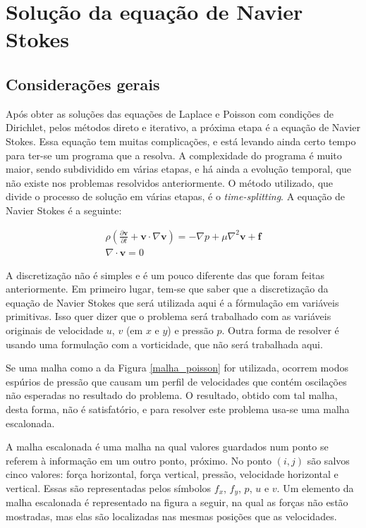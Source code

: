 \documentclass[journal]{IEEEtran}
\begin{document}
\section{Solução da equação de Navier Stokes}
\subsection*{Considerações gerais}
Após obter as soluções das equações de Laplace e Poisson com condições de Dirichlet, pelos métodos direto e iterativo, a próxima etapa é a equação de Navier Stokes. Essa equação tem muitas complicações, e está levando ainda certo tempo para ter-se um programa que a resolva. A complexidade do programa é muito maior, sendo subdividido em várias etapas, e há ainda a evolução temporal, que não existe nos problemas resolvidos anteriormente. O método utilizado, que divide o processo de solução em várias etapas, é o \textit{time-splitting}\cite{notas_de_aula_john}\cite{time_splitting}. A equação de Navier Stokes é a seguinte:

\begin{eqnarray}
\rho\left( \frac{\partial \textbf{v}}{\partial
t}+\textbf{v}\cdot\nabla\textbf{v}\right)=-\nabla
p+\mu\nabla^2\textbf{v}+\textbf{f} \label{ns}\\
 \nabla\cdot \textbf{v}=0 \label{divergente_zero}
\end{eqnarray}

A discretização não é simples e é um pouco diferente das que foram feitas anteriormente. Em primeiro lugar, tem-se que saber que a discretização da equação de Navier Stokes que será utilizada aqui é a fórmulação em variáveis primitivas\cite{notas_de_aula_john}. Isso quer dizer que o problema será trabalhado com as variáveis originais de velocidade $u$, $v$ (em $x$ e $y$) e pressão $p$. Outra forma de resolver é usando uma formulação com a vorticidade, que não será trabalhada aqui\cite{notas_de_aula_john}.

Se uma malha como a da Figura \ref{malha_poisson} for utilizada, ocorrem modos espúrios de pressão que causam um perfil de velocidades que contém oscilações não esperadas no resultado do problema\cite{notas_de_aula_john}. O resultado, obtido com tal malha, desta forma, não é satisfatório, e para resolver este problema usa-se uma malha escalonada\cite{notas_de_aula_john}.

A malha escalonada é uma malha na qual valores guardados num ponto se referem à informação em um outro ponto, próximo. No ponto $(i,j)$ são salvos cinco valores: força horizontal, força vertical, pressão, velocidade horizontal e vertical. Essas são representadas pelos símbolos $f_x$, $f_y$, $p$, $u$ e $v$. Um elemento da malha escalonada é representado na figura a seguir, na qual as forças não estão mostradas, mas elas são localizadas nas mesmas posições que as velocidades.
\end{document}

